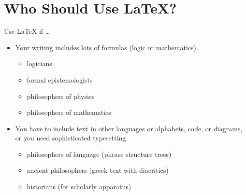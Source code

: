 \section{Who Should Use \LaTeX{}?}


\begin{frame}{Use \LaTeX{} if \dots }

\begin{itemize}
\item Your writing includes lots of formulas (logic or mathematics). 
  \begin{itemize}
  \item logicians 
  \item formal epistemologists
  \item philosophers of physics
  \item philosophers of mathematics
  \end{itemize}

\item You have to include text in other languages or alphabets, code,
or diagrams, or you need sophisticated typesetting 
\begin{itemize}
\item philosophers of language (phrase structure trees)
\item ancient philosophers (greek text with diacritics)
\item historians (for scholarly apparatus)
\end{itemize}

\end{itemize}

\end{frame}

